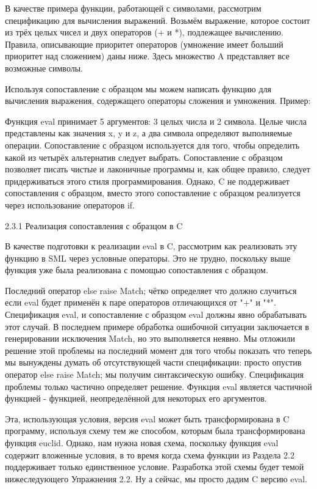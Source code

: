 В качестве примера функции, работающей с символами, рассмотрим спецификацию для вычисления выражений. Возьмём выражение, которое состоит из трёх целых чисел и двух операторов (+ и *), подлежащее вычислению. Правила, описывающие приоритет операторов (умножение имеет больший приоритет над сложением) даны ниже. Здесь множество A представляет все возможные символы.

Используя сопоставление с образцом мы можем написать функцию для вычисления выражения, содержащего операторы сложения и умножения. Пример:

Функция eval принимает 5 аргументов: 3 целых числа и 2 символа. Целые числа представлены как значения x, y и z, а два символа определяют выполняемые операции. Сопоставление с образцом используется для того, чтобы определить какой из четырёх альтернатив следует выбрать. Сопоставление с образцом позволяет писать чистые и лаконичные программы и, как общее правило, следует придерживаться этого стиля программирования. Однако, C не поддерживает сопоставления с образцом, вместо этого сопоставление с образцом реализуется через использование операторов if.

2.3.1 Реализация сопоставления с образцом в C

В качестве подготовки к реализации eval в C, рассмотрим как реализовать эту функцию в SML через условные операторы. Это не трудно, поскольку выше функция уже была реализована с помощью сопоставления с образцом.

Последний оператор else raise Match; чётко определяет что должно случиться если eval будет применён к паре операторов отличающихся от "+" и "*". Спецификация eval, и сопоставление с образцом eval должны явно обрабатывать этот случай. В последнем примере обработка ошибочной ситуации заключается в генерировании исключения Match, но это выполняется неявно. Мы отложили решение этой проблемы на последний момент для того чтобы показать что теперь мы вынуждены думать об отсутствующей части спецификации: просто опустив оператор else raise Match; мы получим синтаксическую ошибку. Спецификация проблемы только частично определяет решение. Функция eval является частичной функцией - функцией, неопределённой для некоторых его аргументов.

Эта, использующая условия, версия eval может быть трансформирована в C программу, используя схему тем же способом, которым была трансформирована функция euclid. Однако, нам нужна новая схема, поскольку функция eval содержит вложенные условия, в то время когда схема функции из Раздела 2.2 поддерживает только единственное условие. Разработка этой схемы будет темой нижеследующего Упражнения 2.2. Ну а сейчас, мы просто дадим C версию eval.

